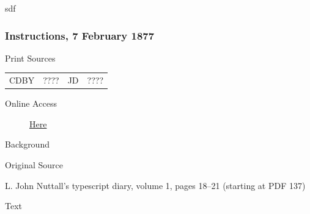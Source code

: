 			sdf
			
		\subsubsection{Instructions, 7 February 1877}
			\label{EMS-1877-BY-7-FEB-1877}
			
			\begin{description}
					\item[Print Sources]
				\end{description}

					\begin{tabular}{p{0.5in}p{1in}p{0.5in}p{1in}}
					CDBY	& ????		& JD 		& ???? \\
					\end{tabular}
				
				\begin{description}
					\item[Online Access] \href{https://archive.org/details/diaryofljohnnutt01nutt/page/n135/mode/2up}{Here}
				\end{description}
				
				\begin{description}
					\item[Background]
				\end{description}
				
					\phantom{.}
				
				\begin{description}
					\item[Original Source]
				\end{description}
				
					L. John Nuttall's typescript diary, volume 1, pages 18--21 (starting at PDF 137)
				
				\begin{description}
					\item[Text]
				\end{description}
				
